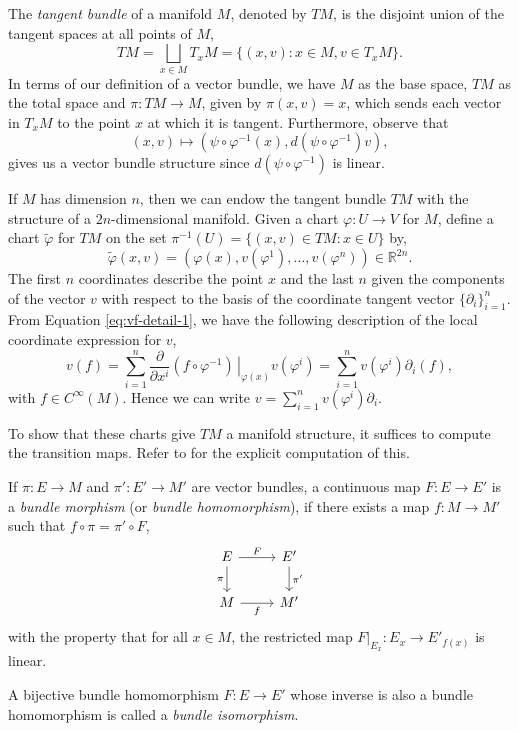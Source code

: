 \begin{definition}
The \textit{tangent bundle} of a manifold $M$, denoted by $TM$, is the disjoint union of the tangent spaces at all points of $M$,
\[
TM=\bigsqcup_{x\in M}T_xM=\{(x,v):x\in M,v\in T_xM\}.
\]
In terms of our definition of a vector bundle, we have $M$ as the base space, $TM$ as the total space and $\pi:TM\to M$, given by $\pi(x,v)=x$, which sends each vector in $T_xM$ to the point $x$ at which it is tangent. Furthermore, observe that
\[
(x,v)\mapsto \left(\psi\circ\varphi^{-1}(x),d(\psi\circ\varphi^{-1})v \right),
\]
gives us a vector bundle structure since $d(\psi\circ\varphi^{-1})$ is linear.
\end{definition}
If $M$ has dimension $n$, then we can endow the tangent bundle $TM$ with the structure of a $2n$-dimensional manifold. Given a chart $\varphi:U\to V$ for $M$, define a chart $\tilde{\varphi}$ for $TM$ on the set $\pi^{-1}(U)=\{(x,v)\in TM:x\in U\}$ by,
\[
\tilde{\varphi}(x,v)=\left(\varphi(x),v(\varphi^1),\ldots,v(\varphi^n) \right)\in\mathbb{R}^{2n}.
\]
The first $n$ coordinates describe the point $x$ and the last $n$ given the components of the vector $v$ with respect to the basis of the coordinate tangent vector $\{\partial_i\}_{i=1}^{n}$. From Equation \eqref{eq:vf-detail-1}, we have the following description of the local coordinate expression for $v$,
\[
v(f)=\sum_{i=1}^n\frac{\partial}{\partial x^i}\left.\left(f\circ\varphi^{-1}\right)\,\right\rvert_{\varphi(x)}v(\varphi^i)=\sum_{i=1}^nv(\varphi^i)\partial_i(f),
\]
with $f\in C^{\infty}(M)$. Hence we can write $v=\sum_{i=1}^nv(\varphi^i)\partial_i$.

To show that these charts give $TM$ a manifold structure, it suffices to compute the transition maps. Refer to \cite{MR2954043} for the explicit computation of this.


\begin{definition}
If $\pi:E\to M$ and $\pi':E'\to M'$ are vector bundles, a continuous map $F:E\to E'$ is a \textit{bundle morphism} (or \textit{bundle homomorphism}), if there exists a map $f:M\to M'$ such that $f\circ\pi=\pi'\circ F$,
\[
\begin{tikzcd}
E \arrow[r,"F"] \arrow{d}[swap]{\pi}
& E' \arrow[d,"\pi'"] \\
M \arrow{r}[swap]{f} & M'
\end{tikzcd}
\]
with the property that for all $x\in M$, the restricted map $F\rvert_{E_x}:E_x\to E'_{f(x)}$ is linear.

A bijective bundle homomorphism $F:E\to E'$ whose inverse is also a bundle homomorphism is called a \textit{bundle isomorphism}.
\end{definition}

